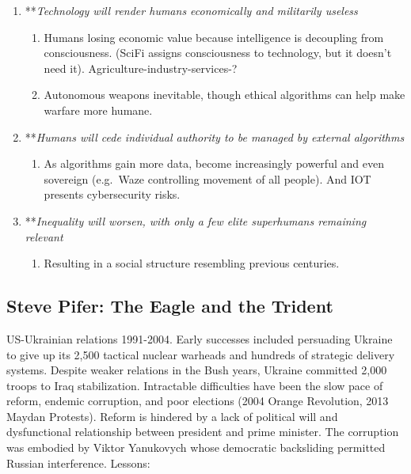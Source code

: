\documentclass[
]{article}
\providecommand{\tightlist}{%
  \setlength{\itemsep}{0pt}\setlength{\parskip}{0pt}}
\begin{document}
\begin{enumerate}
\def\labelenumi{\arabic{enumi}.}
\item
  **\emph{Technology will render humans economically and militarily
  useless}

  \begin{enumerate}
  \def\labelenumii{\arabic{enumii}.}
  \item
    Humans losing economic value because intelligence is decoupling from
    consciousness. (SciFi assigns consciousness to technology, but it
    doesn't need it). Agriculture-industry-services-?
  \item
    Autonomous weapons inevitable, though ethical algorithms can help
    make warfare more humane.
  \end{enumerate}
\item
  **\emph{Humans will cede individual authority to be managed by
  external algorithms}

  \begin{enumerate}
  \def\labelenumii{\arabic{enumii}.}
  \setcounter{enumii}{2}
  \tightlist
  \item
    As algorithms gain more data, become increasingly powerful and even
    sovereign (e.g.~Waze controlling movement of all people). And IOT
    presents cybersecurity risks.
  \end{enumerate}
\item
  **\emph{Inequality will worsen, with only a few elite superhumans
  remaining relevant}

  \begin{enumerate}
  \def\labelenumii{\arabic{enumii}.}
  \setcounter{enumii}{3}
  \tightlist
  \item
    Resulting in a social structure resembling previous centuries.
  \end{enumerate}
\end{enumerate}

\hypertarget{steve-pifer-the-eagle-and-the-trident}{%
\subsection{Steve Pifer: The Eagle and the
Trident}\label{steve-pifer-the-eagle-and-the-trident}}

US-Ukrainian relations 1991-2004. Early successes included persuading
Ukraine to give up its 2,500 tactical nuclear warheads and hundreds of
strategic delivery systems. Despite weaker relations in the Bush years,
Ukraine committed 2,000 troops to Iraq stabilization. Intractable
difficulties have been the slow pace of reform, endemic corruption, and
poor elections (2004 Orange Revolution, 2013 Maydan Protests). Reform is
hindered by a lack of political will and dysfunctional relationship
between president and prime minister. The corruption was embodied by
Viktor Yanukovych whose democratic backsliding permitted Russian
interference. Lessons:
\end{document}

